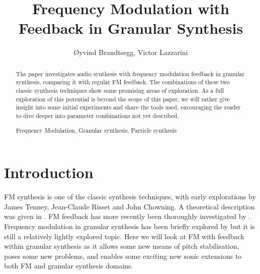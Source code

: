 \documentclass[runningheads,a4paper]{llncs}
\newcommand{\keywords}[1]{\par\addvspace\baselineskip
\noindent\keywordname\enspace\ignorespaces#1}
\begin{document}
\mainmatter  %

\title{Frequency Modulation with Feedback in Granular Synthesis}


\author{\O{}yvind Brandtsegg, Victor Lazzarini}
%




\maketitle

\begin{abstract}

The paper investigates audio synthesis with frequency modulation feedback in granular synthesis, comparing it with regular FM feedback. The combinations of these two classic synthesis techniques show some promising areas of exploration. As a full exploration of this potential is beyond the scope of this paper, we will rather give insight into some initial experiments and share the tools used, encouraging the reader to dive deeper into parameter combinations not yet described.

\keywords{Frequency Modulation, Granular synthesis, Particle synthesis}
\end{abstract}


\section{Introduction}
FM synthesis is one of the classic synthesis techniques, with early explorations by James Tenney, Jean-Claude Risset and John Chowning. A theoretical description was given in \cite{Chowning-73}. FM feedback has more recently been thoroughly investigated by \cite{Lazzarini-2024}. Frequency modulation in granular synthesis has been briefly explored by \cite{Ervik-Brandtsegg} but it is still a relatively lightly explored topic. Here we will look at FM with feedback within granular synthesis as it allows some new means of pitch stabilisation, poses some new problems, and enables some exciting new sonic extensions to both FM and granular synthesis domains.
\end{document}
